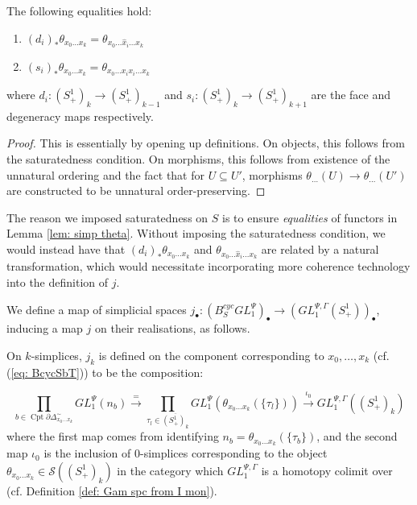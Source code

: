 \documentclass{TPmod}
\newcommand{\Cptd}{\operatorname{Cpt}\partial}
\newcommand{\cS}{\mathcal{S}}
\numberwithin{equation}{section}
\begin{document}
    \begin{lem}\label{lem: simp theta}
        The following equalities hold:
        \begin{enumerate}
            \item $(d_i)_*\theta_{x_0 \ldots x_k} = \theta_{x_0 \ldots \hat x_i \ldots x_k}$
            \item $(s_i)_*\theta_{x_0 \ldots x_k} = \theta_{x_0 \ldots x_i x_i \ldots x_k}$
        \end{enumerate}
        where $d_i: (S^1_+)_k \to (S^1_+)_{k-1}$ and $s_i: (S^1_+)_k \to (S^1_+)_{k+1}$ are the face and degeneracy maps respectively.
    \end{lem}
    \begin{proof}
        This is essentially by opening up definitions. On objects, this follows from the saturatedness condition. On morphisms, this follows from existence of the unnatural ordering and the fact that for $U \subseteq U'$, morphisms $\theta_{\ldots}(U) \to \theta_{\ldots}(U')$ are constructed to be unnatural order-preserving.
    \end{proof}
    \begin{rmk} 
        The reason we imposed saturatedness on $S$ is to ensure \emph{equalities} of functors in Lemma \ref{lem: simp theta}. Without imposing the saturatedness condition, we would instead have that $(d_i)_*\theta_{x_0 \ldots x_k}$ and $\theta_{x_0 \ldots \hat x_i \ldots x_k}$ are related by a natural transformation, which would necessitate incorporating more coherence technology into the definition of $j$.
    \end{rmk}

    \begin{defn}
        We define a map of simplicial spaces $j_\bullet: \left(B_S^{cyc}GL_1^\Psi\right)_\bullet \to \left(GL_1^{\Psi,\Gamma}(S^1_+)\right)_\bullet$, inducing a map $j$ on their realisations, as follows.

        On $k$-simplices, $j_k$ is defined on the component corresponding to $x_0, \ldots, x_k$ (cf. (\ref{eq: BcycSbT})) to be the composition:

        \begin{equation}
            \prod\limits_{b \in \Cptd\Delta^\sim_{x_0 \ldots x_k}} GL_1^\Psi(n_b)
            \xrightarrow{=}
            \prod\limits_{\tau_l \in \overline{(S^1_+)_k}} GL_1^\Psi\left( \theta_{x_0 \ldots x_k}(\{\tau_l\})\right) 
            \xrightarrow{\iota_0} 
            GL_1^{\Psi,\Gamma} \left(\left(S^1_+\right)_k\right)
        \end{equation}
        where the first map comes from identifying $n_b = \theta_{x_0 \ldots x_k}(\{\tau_b\})$, and the second map $\iota_0$ is the inclusion of 0-simplices corresponding to the object $\theta_{x_0 \ldots x_k} \in \cS({(S^1_+)_k})$ in the category which $GL_1^{\Psi,\Gamma}$ is a homotopy colimit over (cf. Definition \ref{def: Gam spc from I mon}).
    \end{defn}
    
\end{document}

